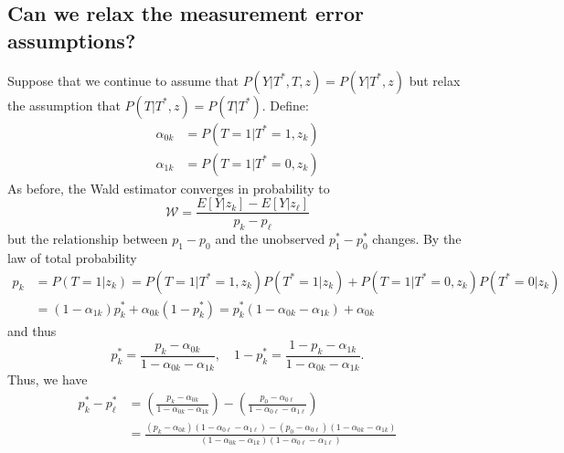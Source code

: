 \documentclass[12pt]{article}
\begin{document}
\subsection{Can we relax the measurement error assumptions?}
Suppose that we continue to assume that $P(Y|T^*,T,z) = P(Y|T^*,z)$ but relax the assumption that $P(T|T^*,z) = P(T|T^*)$.
Define:
\begin{align*}
  \alpha_{0k} &= P\left( T=1|T^*=1, z_k \right)\\
  \alpha_{1k} &= P\left( T=1|T^*=0, z_k \right)
\end{align*}
As before, the Wald estimator converges in probability to
\[
  \mathcal{W} = \frac{E[Y|z_k]-E[Y|z_\ell]}{p_k - p_\ell}
\]
but the relationship between $p_1 - p_0$ and the unobserved $p^*_1 - p^*_0$ changes.
By the law of total probability
\begin{align*}
  p_k &= P(T=1|z_k) = P(T=1|T^*=1,z_k)P(T^*=1|z_k) + P(T=1|T^*=0,z_k)P(T^*=0|z_k)\\
  &= (1 - \alpha_{1k})p_k^* + \alpha_{0k}(1 - p^*_k) = p_k^*(1 - \alpha_{0k} - \alpha_{1k}) + \alpha_{0k}
\end{align*}
and thus
\[
  p_k^* = \frac{p_k - \alpha_{0k}}{1 - \alpha_{0k} - \alpha_{1k}},
  \quad
  1 - p_k^* = \frac{1 - p_k - \alpha_{1k}}{1 - \alpha_{0k} - \alpha_{1k}}.
\]
Thus, we have
\begin{align*}
  p^*_k - p^*_\ell &= \left( \frac{p_k - \alpha_{0k}}{1 - \alpha_{0k} - \alpha_{1k}} \right) - \left( \frac{p_0 - \alpha_{0\ell}}{1 - \alpha_{0\ell} - \alpha_{1\ell}} \right)\\
  &= \frac{\left( p_k - \alpha_{0k} \right)\left( 1 - \alpha_{0\ell} - \alpha_{1\ell} \right) - \left( p_0 - \alpha_{0\ell} \right)\left( 1 - \alpha_{0k} - \alpha_{1k} \right)}{\left( 1 - \alpha_{0k} - \alpha_{1k} \right)\left( 1 - \alpha_{0\ell} - \alpha_{1\ell} \right)}
\end{align*}
\end{document}
